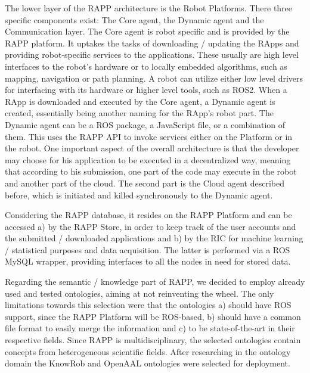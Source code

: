 The lower layer of the R\-A\-P\-P architecture is the Robot Platforms. There three specific components exist\-: The Core agent, the Dynamic agent and the Communication layer. The Core agent is robot specific and is provided by the R\-A\-P\-P platform. It uptakes the tasks of downloading / updating the R\-Apps and providing robot-\/specific services to the applications. These usually are high level interfaces to the robot’s hardware or to locally embedded algorithms, such as mapping, navigation or path planning. A robot can utilize either low level drivers for interfacing with its hardware or higher level tools, such as R\-O\-S2. When a R\-App is downloaded and executed by the Core agent, a Dynamic agent is created, essentially being another naming for the R\-App’s robot part. The Dynamic agent can be a R\-O\-S package, a Java\-Script file, or a combination of them. This uses the R\-A\-P\-P A\-P\-I to invoke services either on the Platform or in the robot. One important aspect of the overall architecture is that the developer may choose for his application to be executed in a decentralized way, meaning that according to his submission, one part of the code may execute in the robot and another part of the cloud. The second part is the Cloud agent described before, which is initiated and killed synchronously to the Dynamic agent.

Considering the R\-A\-P\-P database, it resides on the R\-A\-P\-P Platform and can be accessed a) by the R\-A\-P\-P Store, in order to keep track of the user accounts and the submitted / downloaded applications and b) by the R\-I\-C for machine learning / statistical purposes and data acquisition. The latter is performed via a R\-O\-S My\-S\-Q\-L wrapper, providing interfaces to all the nodes in need for stored data.

Regarding the semantic / knowledge part of R\-A\-P\-P, we decided to employ already used and tested ontologies, aiming at not reinventing the wheel. The only limitations towards this selection were that the ontologies a) should have R\-O\-S support, since the R\-A\-P\-P Platform will be R\-O\-S-\/based, b) should have a common file format to easily merge the information and c) to be state-\/of-\/the-\/art in their respective fields. Since R\-A\-P\-P is multidisciplinary, the selected ontologies contain concepts from heterogeneous scientific fields. After researching in the ontology domain the Know\-Rob and Open\-A\-A\-L ontologies were selected for deployment.

